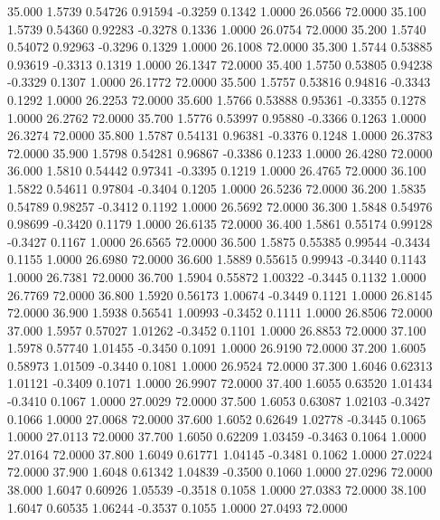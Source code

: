   35.000   1.5739   0.54726   0.91594  -0.3259   0.1342   1.0000  26.0566  72.0000
  35.100   1.5739   0.54360   0.92283  -0.3278   0.1336   1.0000  26.0754  72.0000
  35.200   1.5740   0.54072   0.92963  -0.3296   0.1329   1.0000  26.1008  72.0000
  35.300   1.5744   0.53885   0.93619  -0.3313   0.1319   1.0000  26.1347  72.0000
  35.400   1.5750   0.53805   0.94238  -0.3329   0.1307   1.0000  26.1772  72.0000
  35.500   1.5757   0.53816   0.94816  -0.3343   0.1292   1.0000  26.2253  72.0000
  35.600   1.5766   0.53888   0.95361  -0.3355   0.1278   1.0000  26.2762  72.0000
  35.700   1.5776   0.53997   0.95880  -0.3366   0.1263   1.0000  26.3274  72.0000
  35.800   1.5787   0.54131   0.96381  -0.3376   0.1248   1.0000  26.3783  72.0000
  35.900   1.5798   0.54281   0.96867  -0.3386   0.1233   1.0000  26.4280  72.0000
  36.000   1.5810   0.54442   0.97341  -0.3395   0.1219   1.0000  26.4765  72.0000
  36.100   1.5822   0.54611   0.97804  -0.3404   0.1205   1.0000  26.5236  72.0000
  36.200   1.5835   0.54789   0.98257  -0.3412   0.1192   1.0000  26.5692  72.0000
  36.300   1.5848   0.54976   0.98699  -0.3420   0.1179   1.0000  26.6135  72.0000
  36.400   1.5861   0.55174   0.99128  -0.3427   0.1167   1.0000  26.6565  72.0000
  36.500   1.5875   0.55385   0.99544  -0.3434   0.1155   1.0000  26.6980  72.0000
  36.600   1.5889   0.55615   0.99943  -0.3440   0.1143   1.0000  26.7381  72.0000
  36.700   1.5904   0.55872   1.00322  -0.3445   0.1132   1.0000  26.7769  72.0000
  36.800   1.5920   0.56173   1.00674  -0.3449   0.1121   1.0000  26.8145  72.0000
  36.900   1.5938   0.56541   1.00993  -0.3452   0.1111   1.0000  26.8506  72.0000
  37.000   1.5957   0.57027   1.01262  -0.3452   0.1101   1.0000  26.8853  72.0000
  37.100   1.5978   0.57740   1.01455  -0.3450   0.1091   1.0000  26.9190  72.0000
  37.200   1.6005   0.58973   1.01509  -0.3440   0.1081   1.0000  26.9524  72.0000
  37.300   1.6046   0.62313   1.01121  -0.3409   0.1071   1.0000  26.9907  72.0000
  37.400   1.6055   0.63520   1.01434  -0.3410   0.1067   1.0000  27.0029  72.0000
  37.500   1.6053   0.63087   1.02103  -0.3427   0.1066   1.0000  27.0068  72.0000
  37.600   1.6052   0.62649   1.02778  -0.3445   0.1065   1.0000  27.0113  72.0000
  37.700   1.6050   0.62209   1.03459  -0.3463   0.1064   1.0000  27.0164  72.0000
  37.800   1.6049   0.61771   1.04145  -0.3481   0.1062   1.0000  27.0224  72.0000
  37.900   1.6048   0.61342   1.04839  -0.3500   0.1060   1.0000  27.0296  72.0000
  38.000   1.6047   0.60926   1.05539  -0.3518   0.1058   1.0000  27.0383  72.0000
  38.100   1.6047   0.60535   1.06244  -0.3537   0.1055   1.0000  27.0493  72.0000
